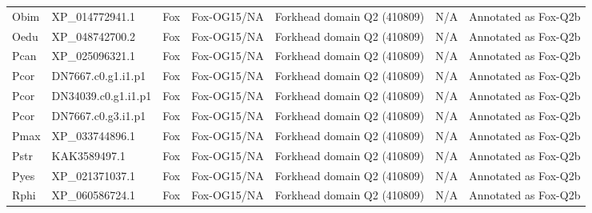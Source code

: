 \documentclass[../main.tex]{subfiles}
\begin{document}
\begin{landscape}
\begin{longtable}{lllllll}
		Obim           & XP\_014772941.1       & Fox            & Fox-OG15/NA         & Forkhead domain Q2 (410809)                 & N/A                                                                    & Annotated as Fox-Q2b \\
		Oedu           & XP\_048742700.2       & Fox            & Fox-OG15/NA         & Forkhead domain Q2 (410809)                 & N/A                                                                    & Annotated as Fox-Q2b \\
		Pcan           & XP\_025096321.1       & Fox            & Fox-OG15/NA         & Forkhead domain Q2 (410809)                 & N/A                                                                    & Annotated as Fox-Q2b \\
		Pcor           & DN7667.c0.g1.i1.p1    & Fox            & Fox-OG15/NA         & Forkhead domain Q2 (410809)                 & N/A                                                                    & Annotated as Fox-Q2b \\
		Pcor           & DN34039.c0.g1.i1.p1   & Fox            & Fox-OG15/NA         & Forkhead domain Q2 (410809)                 & N/A                                                                    & Annotated as Fox-Q2b \\
		Pcor           & DN7667.c0.g3.i1.p1    & Fox            & Fox-OG15/NA         & Forkhead domain Q2 (410809)                 & N/A                                                                    & Annotated as Fox-Q2b \\
		Pmax           & XP\_033744896.1       & Fox            & Fox-OG15/NA         & Forkhead domain Q2 (410809)                 & N/A                                                                    & Annotated as Fox-Q2b \\
		Pstr           & KAK3589497.1          & Fox            & Fox-OG15/NA         & Forkhead domain Q2 (410809)                 & N/A                                                                    & Annotated as Fox-Q2b \\
		Pyes           & XP\_021371037.1       & Fox            & Fox-OG15/NA         & Forkhead domain Q2 (410809)                 & N/A                                                                    & Annotated as Fox-Q2b \\
		Rphi           & XP\_060586724.1       & Fox            & Fox-OG15/NA         & Forkhead domain Q2 (410809)                 & N/A                                                                    & Annotated as Fox-Q2b \\

\end{longtable}
\end{landscape}
\end{document}
